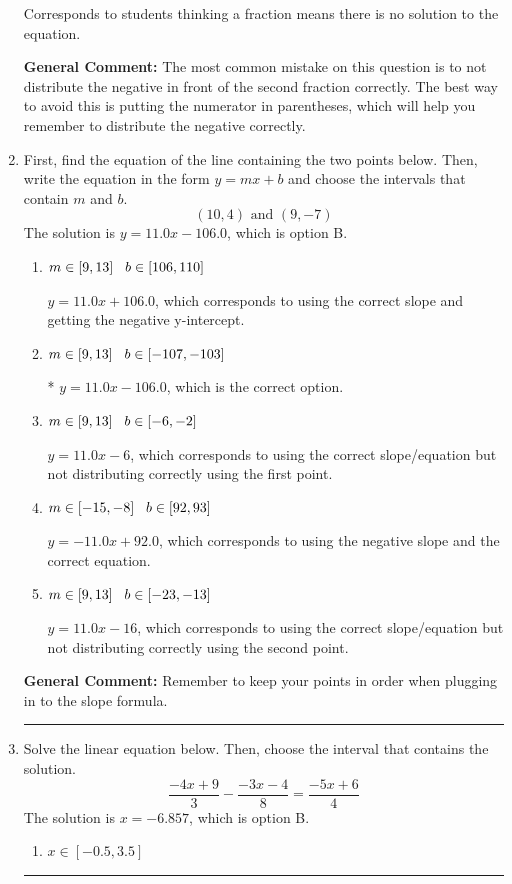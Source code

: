 \documentclass{extbook}[14pt]
\newcommand{\litem}[1]{\item #1

\rule{\textwidth}{0.4pt}}
\begin{document}
\begin{enumerate}
{\begin{enumerate}[label=\Alph*.]
Corresponds to students thinking a fraction means there is no solution to the equation.
\end{enumerate}

\textbf{General Comment:} The most common mistake on this question is to not distribute the negative in front of the second fraction correctly. The best way to avoid this is putting the numerator in parentheses, which will help you remember to distribute the negative correctly.
}
\litem{
First, find the equation of the line containing the two points below. Then, write the equation in the form $ y=mx+b $ and choose the intervals that contain $m$ and $b$.
\[ (10, 4) \text{ and } (9, -7) \]The solution is \( y = 11.0x -106.0 \), which is option B.\begin{enumerate}[label=\Alph*.]
\item \( m \in [9, 13] \hspace*{3mm} b \in [106, 110] \)

 $y = 11.0x + 106.0$, which corresponds to using the correct slope and getting the negative y-intercept.
\item \( m \in [9, 13] \hspace*{3mm} b \in [-107, -103] \)

* $y = 11.0x -106.0$, which is the correct option.
\item \( m \in [9, 13] \hspace*{3mm} b \in [-6, -2] \)

 $y = 11.0x -6$, which corresponds to using the correct slope/equation but not distributing correctly using the first point.
\item \( m \in [-15, -8] \hspace*{3mm} b \in [92, 93] \)

 $y = -11.0x + 92.0$, which corresponds to using the negative slope and the correct equation.
\item \( m \in [9, 13] \hspace*{3mm} b \in [-23, -13] \)

 $y = 11.0x -16$, which corresponds to using the correct slope/equation but not distributing correctly using the second point.
\end{enumerate}

\textbf{General Comment:} Remember to keep your points in order when plugging in to the slope formula.
}
\litem{
Solve the linear equation below. Then, choose the interval that contains the solution.
\[ \frac{-4x + 9}{3} - \frac{-3x -4}{8} = \frac{-5x + 6}{4} \]The solution is \( x = -6.857 \), which is option B.\begin{enumerate}[label=\Alph*.]
\item \( x \in [-0.5, 3.5] \)


\end{enumerate}}
\end{enumerate}
\end{document}
